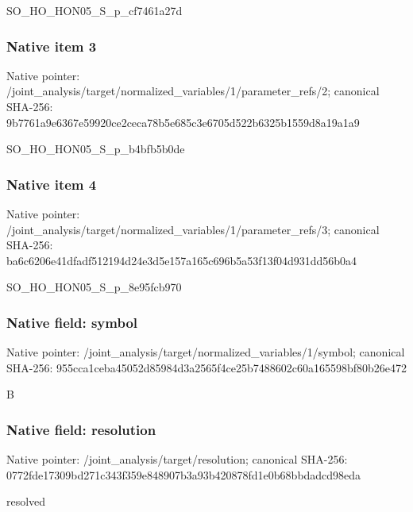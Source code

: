\documentclass[10pt,a4paper]{article}
\begin{document}
\begingroup\raggedright\sloppy SO\_\allowbreak{}HO\_\allowbreak{}HON05\_\allowbreak{}S\_\allowbreak{}p\_\allowbreak{}cf7461a27d\par\endgroup

\subsubsection{Native item 3}
Native pointer: /joint\_\allowbreak{}analysis/target/normalized\_\allowbreak{}variables/1/parameter\_\allowbreak{}refs/2; canonical SHA-256: 9b7761a9e6367e59920ce2ceca78b5e685c3e6705d522b6325b1559d8a19a1a9

\begingroup\raggedright\sloppy SO\_\allowbreak{}HO\_\allowbreak{}HON05\_\allowbreak{}S\_\allowbreak{}p\_\allowbreak{}b4bfb5b0de\par\endgroup

\subsubsection{Native item 4}
Native pointer: /joint\_\allowbreak{}analysis/target/normalized\_\allowbreak{}variables/1/parameter\_\allowbreak{}refs/3; canonical SHA-256: ba6c6206e41dfadf512194d24e3d5e157a165c696b5a53f13f04d931dd56b0a4

\begingroup\raggedright\sloppy SO\_\allowbreak{}HO\_\allowbreak{}HON05\_\allowbreak{}S\_\allowbreak{}p\_\allowbreak{}8e95fcb970\par\endgroup

\subsubsection{Native field: symbol}
Native pointer: /joint\_\allowbreak{}analysis/target/normalized\_\allowbreak{}variables/1/symbol; canonical SHA-256: 955cca1ceba45052d85984d3a2565f4ce25b7488602c60a165598bf80b26e472

\begingroup\raggedright\sloppy B\par\endgroup

\subsubsection{Native field: resolution}
Native pointer: /joint\_\allowbreak{}analysis/target/resolution; canonical SHA-256: 0772fde17309bd271c343f359e848907b3a93b420878fd1e0b68bbdadcd98eda

\begingroup\raggedright\sloppy resolved\par\endgroup
\end{document}
